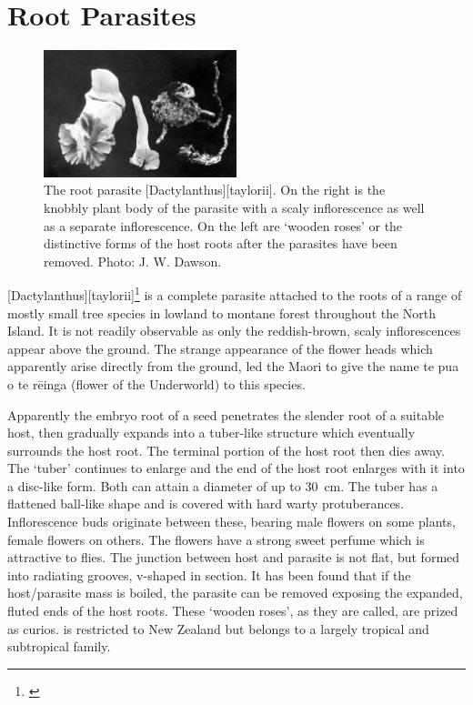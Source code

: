 \section{Root Parasites}

\begin{figure}
	\includegraphics[width=0.5\textwidth]{graphics/figure58dactylanthus.jpg}
	\centering
	\caption[The root parasite \emph{Dactylanthus taylorii}]{The root parasite [Dactylanthus][taylorii].
	On the right is the knobbly plant body of the parasite with a scaly inflorescence as well as a separate inflorescence.
	On the left are `wooden roses' or the distinctive forms of the host roots after the parasites have been removed.
	Photo: J. W. Dawson.}%
	\label{fig:58dactylanthus}
\end{figure}

[Dactylanthus][taylorii]\footnote{\cite{moore1940structure}} is a complete parasite attached to the roots of a range of mostly small tree species in lowland to montane forest throughout the North Island.
It is not readily observable as only the reddish-brown, scaly inflorescences appear above the ground.
The strange appearance of the flower heads which apparently arise directly from the ground, led the Maori to give the name te pua o te rēinga (flower of the Underworld) to this species.

Apparently the embryo root of a  seed penetrates the slender root of a suitable host, then gradually expands into a tuber-like structure which eventually surrounds the host root.
The terminal portion of the host root then dies away.
The `tuber' continues to enlarge and the end of the host root enlarges with it into a disc-like form.
Both can attain a diameter of up to \SI{30}{\centi\metre}.
The tuber has a flattened ball-like shape and is covered with hard warty protuberances.
Inflorescence buds originate between these, bearing male flowers on some plants, female flowers on others.
The flowers have a strong sweet perfume which is attractive to flies.
The junction between host and parasite is not flat, but formed into radiating grooves, v-shaped in section.
It has been found that if the host/parasite mass is boiled, the parasite can be removed exposing the expanded, fluted ends of the host roots.
These `wooden roses', as they are called, are prized as curios.  is restricted to New Zealand but belongs to a largely tropical and subtropical family.

